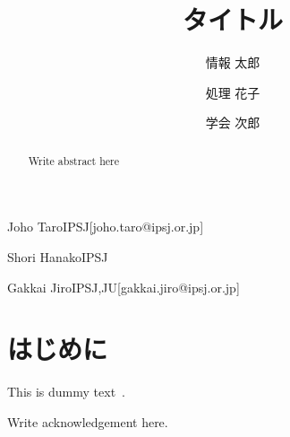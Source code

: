 \documentclass[submit,techrep,noauthor]{ipsj}
\begin{document}
\title{タイトル}




\author{情報 太郎}{Joho Taro}{IPSJ}[joho.taro@ipsj.or.jp]
\author{処理 花子}{Shori Hanako}{IPSJ}
\author{学会 次郎}{Gakkai Jiro}{IPSJ,JU}[gakkai.jiro@ipsj.or.jp]

\begin{abstract}
  Write abstract here
\end{abstract}


\maketitle

\section{はじめに}

This is dummy text~\cite{dummy}.

\begin{acknowledgment}
  Write acknowledgement here.
\end{acknowledgment}




\end{document}
